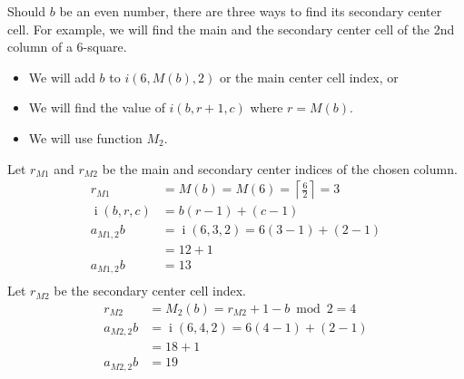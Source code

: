 \documentclass[twoside,openany,12pt]{book}
\begin{document}
    Should $b$ be an even number, there are three ways to find its secondary center cell. For example, we will find the main and the secondary center cell of the 2nd column of a 6-square.
    \begin{itemize}
        \item We will add $b$ to $i(6,M(b),2)$ or the main center cell index, or
        \item We will find the value of $i(b,r+1,c)$ where $r=M(b)$.
        \item We will use function $M_{2}$.
    \end{itemize}
    Let $r_{M1}$ and $r_{M2}$ be the main and secondary center indices of the chosen column.
    \begin{equation}
        \begin{split}
            r_{M1} &= M(b) = M(6) = \left\lceil \frac{6}{2} \right\rceil = 3 \\
            \operatorname{i}(b,r,c) &= b(r-1)+(c-1) \\
            a_{M1,2}b &= \operatorname{i}(6,3,2) = 6(3-1)+(2-1) \\
                &= 12 + 1 \\
            a_{M1,2}b &= 13 \\
        \end{split}
    \end{equation}
    Let $r_{M2}$ be the secondary center cell index.
    \begin{equation}
        \begin{split}
            r_{M2} &= M_2(b) = r_{M2} + 1 - b\bmod 2 = 4 \\
            a_{M2,2}b &= \operatorname{i}(6,4,2) = 6(4-1)+(2-1) \\
                &= 18 + 1 \\
            a_{M2,2}b &= 19
        \end{split}
    \end{equation}
\end{document}
